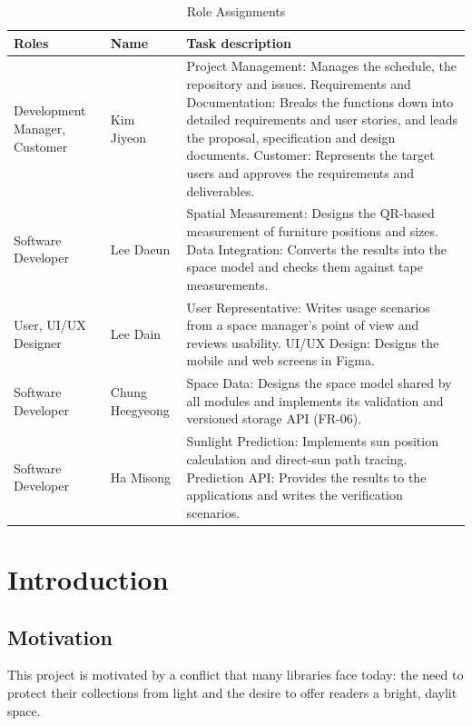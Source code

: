 \documentclass[conference]{IEEEtran}
\newcommand{\gapsection}{\vspace{1.2ex}}
\newcommand{\gapsubsection}{\vspace{0.5ex}}
\begin{document}
\begin{table}[!h]
\caption{Role Assignments}
\label{tab:roles}
\centering
\footnotesize
\setlength{\tabcolsep}{3pt}
\renewcommand{\arraystretch}{1.15}
\begin{tabular}{|L{0.2\columnwidth}|L{0.17\columnwidth}|L{0.48\columnwidth}|}
\hline
Roles & Name & Task description \\
\hline
Development Manager, Customer & Kim Jiyeon &
Project Management: Manages the schedule, the repository and issues.\newline
Requirements and Documentation: Breaks the functions down into detailed requirements and user stories, and leads the proposal, specification and design documents.\newline
Customer: Represents the target users and approves the requirements and deliverables. \\
\hline
Software Developer & Lee Daeun &
Spatial Measurement: Designs the QR-based measurement of furniture positions and sizes.\newline
Data Integration: Converts the results into the space model and checks them against tape measurements. \\
\hline
User, UI/UX Designer & Lee Dain &
User Representative: Writes usage scenarios from a space manager's point of view and reviews usability.\newline
UI/UX Design: Designs the mobile and web screens in Figma. \\
\hline
Software Developer & Chung Heegyeong &
Space Data: Designs the space model shared by all modules and implements its validation and versioned storage API (FR-06). \\
\hline
Software Developer & Ha Misong &
Sunlight Prediction: Implements sun position calculation and direct-sun path tracing.\newline
Prediction API: Provides the results to the applications and writes the verification scenarios. \\
\hline
\end{tabular}
\end{table}

\gapsection
\section{Introduction}
\gapsubsection
\subsection{Motivation}
This project is motivated by a conflict that many libraries face today: the need to protect their collections from light and the desire to offer readers a bright, daylit space.
\end{document}
